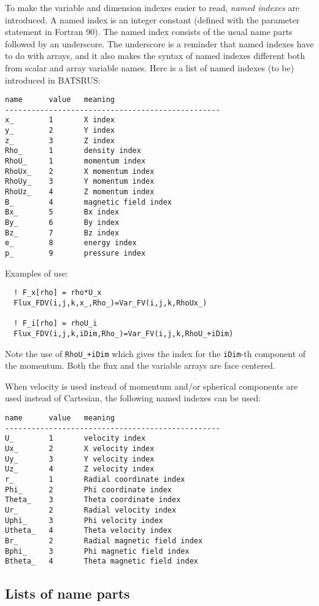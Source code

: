 To make the variable and dimension indexes easier to read, 
{\it named indexes} are introduced. A named index is
an integer constant (defined with the parameter statement in Fortran 90).
The named index consists of the usual name parts followed by
an underscore. The underscore is a reminder that named indexes
have to do with arrays, and it also makes the syntax of named
indexes different both from scalar and array variable names. 
Here is a list of named indexes (to be) introduced in BATSRUS:
\begin{verbatim}
name      value   meaning
-------------------------------------------------
x_        1       X index
y_        2       Y index
z_        3       Z index
Rho_      1       density index
RhoU_     1       momentum index
RhoUx_    2       X momentum index
RhoUy_    3       Y momentum index
RhoUz_    4       Z momentum index
B_        4       magnetic field index
Bx_       5       Bx index
By_       6       By index
Bz_       7       Bz index
e_        8       energy index
p_        9       pressure index
\end{verbatim}
Examples of use:
\begin{verbatim}
  ! F_x[rho] = rho*U_x
  Flux_FDV(i,j,k,x_,Rho_)=Var_FV(i,j,k,RhoUx_)

  ! F_i[rho] = rhoU_i
  Flux_FDV(i,j,k,iDim,Rho_)=Var_FV(i,j,k,RhoU_+iDim)
\end{verbatim}
Note the use of {\tt RhoU\_+iDim} which gives the index for the
{\tt iDim}-th component of the momentum. Both the flux and
the variable arrays are face centered.

When velocity is used instead of momentum and/or spherical components
are used instead of Cartesian, the following named indexes can be used:
\begin{verbatim}
name      value   meaning
-------------------------------------------------
U_        1       velocity index
Ux_       2       X velocity index
Uy_       3       Y velocity index
Uz_       4       Z velocity index
r_        1       Radial coordinate index
Phi_      2       Phi coordinate index
Theta_    3       Theta coordinate index
Ur_       2       Radial velocity index
Uphi_     3       Phi velocity index
Utheta_   4       Theta velocity index
Br_       2       Radial magnetic field index
Bphi_     3       Phi magnetic field index
Btheta_   4       Theta magnetic field index
\end{verbatim}

\subsection{Lists of name parts}

